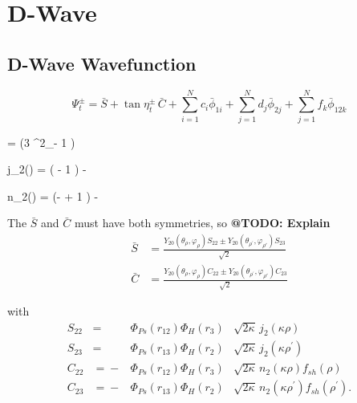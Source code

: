 \documentclass[Dissertation.tex]{subfiles}
\begin{document}
\chapter{D-Wave}
\label{chp:DWave}


\section{D-Wave Wavefunction}
\label{sec:DWaveFn}

\begin{equation}
\Psi_t^\pm = \bar{S} + \tan \eta_t^\pm \, \bar{C} + \sum_{i=1}^N c_i \bar{\phi}_{1i} + \sum_{j=1}^N d_j \bar{\phi}_{2j} + \sum_{j=1}^N f_k \bar{\phi}_{12k}
\label{eq:DWaveSimple}
\end{equation}


\beq
{} =  \left(3 \cos^2\theta_\rho - 1 \right)
\eeq

\beq
j_2(\kappa \rho) = \left( - 1 \right) \frac{\sin(\kappa\rho)}{\kappa\rho} - 
\eeq

\beq
n_2(\kappa \rho) = \left(- + 1 \right) \frac{\cos(\kappa\rho)}{\kappa\rho} - 
\eeq



\noindent The $\bar{S}$ and $\bar{C}$ must have both symmetries, so \textbf{@TODO: Explain}
\begin{subequations}
\label{eq:DWaveSandCBar}
\begin{align}
\bar{S} &= \frac{Y_{20}(\theta_\rho,\varphi_\rho)S_{22} \pm Y_{20}(\theta_{\rho^\prime},\varphi_{\rho'})S_{23} }{\sqrt{2}} \label{eq:DWaveSBar} \\
\bar{C} &= \frac{Y_{20}(\theta_\rho,\varphi_\rho)C_{22} \pm Y_{20}(\theta_{\rho^\prime},\varphi_{\rho'})C_{23} }{\sqrt{2}} \label{eq:DWaveCBar} 
\end{align}
\end{subequations}

\noindent with
\begin{subequations}
\label{eq:DWaveSandC}
\begin{alignat}{2}
S_{22} &={}&\Phi_{Ps}\left(r_{12}\right) \Phi_H\left(r_3\right) &\sqrt{2\kappa} \,j_2\!\left(\kappa\rho\right) \label{eq:DWaveS22Def} \\
S_{23} &={}&\Phi_{Ps}\left(r_{13}\right) \Phi_H\left(r_2\right) &\sqrt{2\kappa} \,j_2\!\left(\kappa\rho^\prime\right) \label{eq:DWaveS23Def} \\
C_{22} &={}-&\Phi_{Ps}\left(r_{12}\right) \Phi_H\left(r_3\right) &\sqrt{2\kappa} \,n_2\!\left(\kappa\rho\right) f_{sh}(\rho) \label{eq:DWaveC22Def} \\
C_{23} &={}-&\Phi_{Ps}\left(r_{13}\right) \Phi_H\left(r_2\right) &\sqrt{2\kappa} \,n_2\!\left(\kappa\rho^\prime\right) f_{sh}(\rho^\prime). \label{eq:DWaveC23Def}
\end{alignat}
\end{subequations}
\end{document}
